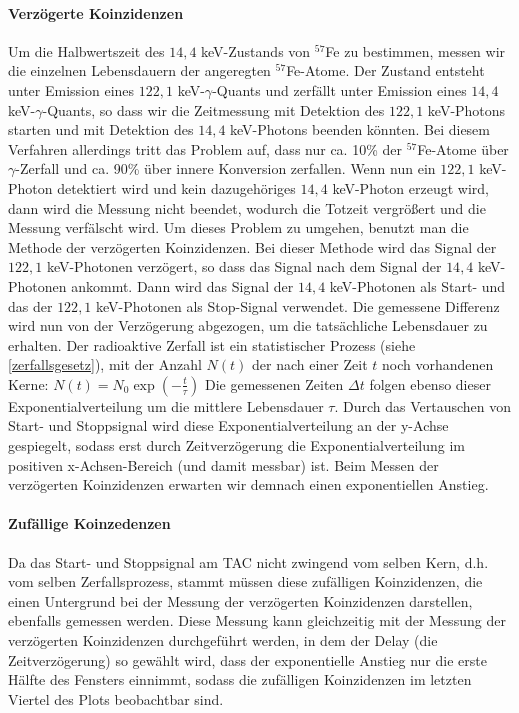 \documentclass[12pt]{article}
\begin{document}
 \paragraph{Verzögerte Koinzidenzen}Um die Halbwertszeit des $14,4$ keV-Zustands von $^{57}$Fe zu bestimmen, messen wir die einzelnen Lebensdauern der angeregten $^{57}$Fe-Atome. Der Zustand entsteht unter Emission eines $122,1$ keV-$\gamma$-Quants und zerfällt unter Emission eines $14,4$ keV-$\gamma$-Quants, so dass wir die Zeitmessung mit Detektion des $122,1$ keV-Photons starten und mit Detektion des $14,4$ keV-Photons beenden könnten. Bei diesem Verfahren allerdings tritt das Problem auf, dass nur ca. 10\% der $^{57}$Fe-Atome über $\gamma$-Zerfall und ca. 90\% über innere Konversion zerfallen. Wenn nun ein $122,1$ keV-Photon detektiert wird und kein dazugehöriges $14,4$ keV-Photon erzeugt wird, dann wird die Messung nicht beendet, wodurch die Totzeit vergrößert und die Messung verfälscht wird.
 Um dieses Problem zu umgehen, benutzt man die Methode der verzögerten Koinzidenzen. Bei dieser Methode wird das Signal der $122,1$ keV-Photonen verzögert, so dass das Signal nach dem Signal der $14,4$ keV-Photonen ankommt. Dann wird das Signal der $14,4$ keV-Photonen als Start- und das der $122,1$ keV-Photonen als Stop-Signal verwendet. Die gemessene Differenz wird nun von der Verzögerung abgezogen, um die tatsächliche Lebensdauer zu erhalten.
 Der radioaktive Zerfall ist ein statistischer Prozess (siehe \ref{zerfallsgesetz}), mit der Anzahl $N(t)$ der nach einer Zeit $t$ noch vorhandenen Kerne: $N(t)=N_0\exp({-\frac t \tau})$ Die gemessenen Zeiten $\Delta t$ folgen ebenso dieser Exponentialverteilung um die mittlere Lebensdauer $\tau$.
 Durch das Vertauschen von Start- und Stoppsignal wird diese Exponentialverteilung an der y-Achse gespiegelt, sodass erst durch Zeitverzögerung die Exponentialverteilung im positiven x-Achsen-Bereich  (und damit messbar) ist. Beim Messen der verzögerten Koinzidenzen erwarten wir demnach einen exponentiellen Anstieg.
 
 \paragraph{Zufällige Koinzedenzen} Da das Start- und Stoppsignal am TAC nicht zwingend vom selben Kern, d.h. vom selben Zerfallsprozess, stammt müssen diese zufälligen Koinzidenzen, die einen Untergrund bei der Messung der verzögerten Koinzidenzen darstellen, ebenfalls gemessen werden. Diese Messung kann gleichzeitig mit der Messung der verzögerten Koinzidenzen durchgeführt werden, in dem der Delay (die Zeitverzögerung) so gewählt wird, dass der exponentielle Anstieg nur die erste Hälfte des Fensters einnimmt, sodass die zufälligen Koinzidenzen im letzten Viertel des Plots beobachtbar sind. 
 
\end{document}
